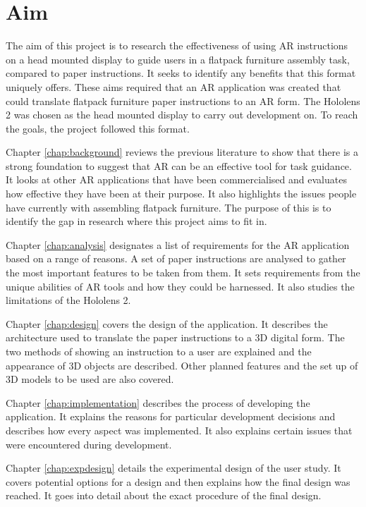\documentclass{l4proj}
\begin{document}
\section{Aim}

The aim of this project is to research the effectiveness of using AR instructions on a head mounted display to guide users in a flatpack furniture assembly task, compared to paper instructions. It seeks to identify any benefits that this format uniquely offers. These aims required that an AR application was created that could translate flatpack furniture paper instructions to an AR form. The Hololens 2 was chosen as the head mounted display to carry out development on. To reach the goals, the project followed this format.

Chapter \ref{chap:background} reviews the previous literature to show that there is a strong foundation to suggest that AR can be an effective tool for task guidance. It looks at other AR applications that have been commercialised and evaluates how effective they have been at their purpose. It also highlights the issues people have currently with assembling flatpack furniture. The purpose of this is to identify the gap in research where this project aims to fit in.

Chapter \ref{chap:analysis} designates a list of requirements for the AR application based on a range of reasons. A set of paper instructions are analysed to gather the most important features to be taken from them. It sets requirements from the unique abilities of AR tools and how they could be harnessed. It also studies the limitations of the Hololens 2.

Chapter \ref{chap:design} covers the design of the application. It describes the architecture used to translate the paper instructions to a 3D digital form. The two methods of showing an instruction to a user are explained and the appearance of 3D objects are described. Other planned features and the set up of 3D models to be used are also covered.

Chapter \ref{chap:implementation} describes the process of developing the application. It explains the reasons for particular development decisions and describes how every aspect was implemented. It also explains certain issues that were encountered during development.

Chapter \ref{chap:expdesign} details the experimental design of the user study. It covers potential options for a design and then explains how the final design was reached. It goes into detail about the exact procedure of the final design.
\end{document}
